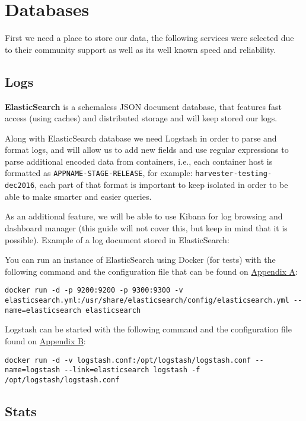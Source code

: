 \chapter{Databases}

First we need a place to store our data, 
the following services were selected due to their community support as well as its well known speed and reliability.

\section{Logs}

\textbf{ElasticSearch} \citep{elasticsearch} is a schemaless JSON document database, that features fast access (using caches) and distributed storage and will keep stored our logs.

Along with ElasticSearch database we need Logstash 
in order to parse and format logs, and will allow us to add new fields and use regular expressions to parse additional encoded data from containers, i.e., each container host is formatted as \texttt{APPNAME-STAGE-RELEASE}, for example: \texttt{harvester-testing-dec2016}, each part of that format is important to keep isolated in order to be able to make smarter and easier queries.

As an additional feature, we will be able to use Kibana for log browsing and dashboard manager (this guide will not cover this, but keep in mind that it is possible). Example of a log document stored in ElasticSearch:


You can run an instance of ElasticSearch using Docker (for tests) with the following command and the configuration file that can be found on \hyperref[sec:appendix-a]{Appendix A}:

\begin{lstlisting}
docker run -d -p 9200:9200 -p 9300:9300 -v elasticsearch.yml:/usr/share/elasticsearch/config/elasticsearch.yml --name=elasticsearch elasticsearch
\end{lstlisting}

Logstash can be started with the following command and the configuration file found on \hyperref[sec:appendix-b]{Appendix B}:
\begin{lstlisting}
docker run -d -v logstash.conf:/opt/logstash/logstash.conf --name=logstash --link=elasticsearch logstash -f /opt/logstash/logstash.conf
\end{lstlisting}

\section{Stats}

